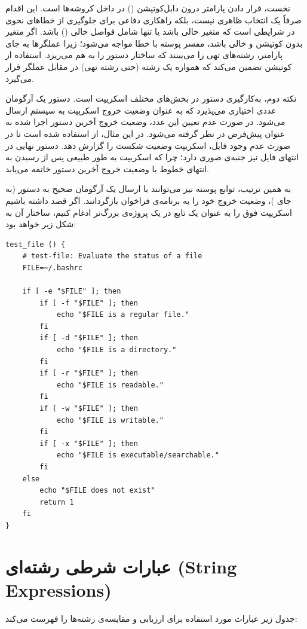 نخست، قرار دادن پارامتر  درون دابل‌کوتیشن () در داخل کروشه‌ها است. این اقدام صرفاً یک انتخاب ظاهری نیست، بلکه راهکاری دفاعی برای جلوگیری از خطاهای نحوی در شرایطی است که متغیر خالی باشد یا تنها شامل فواصل خالی () باشد. اگر متغیر بدون کوتیشن و خالی باشد، مفسر پوسته با خطا مواجه می‌شود؛ زیرا عملگرها به جای پارامتر، رشته‌های تهی را می‌بینند که ساختار دستور را به هم می‌ریزد. استفاده از کوتیشن تضمین می‌کند که همواره یک رشته (حتی رشته تهی) در مقابل عملگر قرار می‌گیرد.

نکته دوم، به‌کارگیری دستور  در بخش‌های مختلف اسکریپت است. دستور  یک آرگومان عددی اختیاری می‌پذیرد که به عنوان وضعیت خروج اسکریپت به سیستم ارسال می‌شود. در صورت عدم تعیین این عدد، وضعیت خروج آخرین دستور اجرا شده به عنوان پیش‌فرض در نظر گرفته می‌شود. در این مثال، از  استفاده شده است تا در صورت عدم وجود فایل، اسکریپت وضعیت شکست را گزارش دهد. دستور  نهایی در انتهای فایل نیز جنبه‌ی صوری دارد؛ چرا که اسکریپت به طور طبیعی پس از رسیدن به انتهای خطوط با وضعیت خروج آخرین دستور خاتمه می‌یابد.

به همین ترتیب، توابع پوسته نیز می‌توانند با ارسال یک آرگومان صحیح به دستور  (به جای )، وضعیت خروج خود را به برنامه‌ی فراخوان بازگردانند. اگر قصد داشته باشیم اسکریپت فوق را به عنوان یک تابع در یک پروژه‌ی بزرگ‌تر ادغام کنیم، ساختار آن به شکل زیر خواهد بود:

\begin{latin}
\begin{lstlisting}
test_file () {
    # test-file: Evaluate the status of a file
    FILE=~/.bashrc

    if [ -e "$FILE" ]; then
        if [ -f "$FILE" ]; then
            echo "$FILE is a regular file."
        fi
        if [ -d "$FILE" ]; then
            echo "$FILE is a directory."
        fi
        if [ -r "$FILE" ]; then
            echo "$FILE is readable."
        fi
        if [ -w "$FILE" ]; then
            echo "$FILE is writable."
        fi
        if [ -x "$FILE" ]; then
            echo "$FILE is executable/searchable."
        fi
    else
        echo "$FILE does not exist"
        return 1
    fi
}
\end{lstlisting}
\end{latin}

\section{عبارات شرطی رشته‌ای (String Expressions)}

جدول زیر عبارات مورد استفاده برای ارزیابی و مقایسه‌ی رشته‌ها را فهرست می‌کند:

